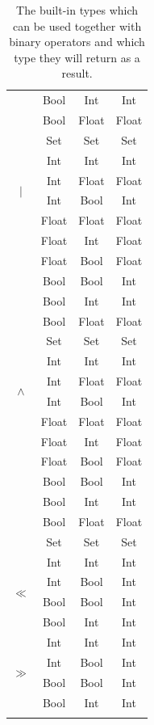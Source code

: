 \documentclass[12pt, titlepage]{article}
\begin{document}
\begin{longtable}{ |c |c |c |c | }
	                     & Bool & Int & Int \\
	                     & Bool & Float & Float \\
	                      & Set & Set & Set \\     
	                      \hline 
	\multirow{4}{*}{$|$} & Int & Int & Int \\
	                     & Int & Float & Float \\
	                     & Int & Bool & Int \\
	                     & Float & Float & Float \\
	                     & Float & Int & Float \\
	                     & Float & Bool & Float \\
	                     & Bool & Bool & Int \\
	                     & Bool & Int & Int \\
	                     & Bool & Float & Float \\
	                     & Set & Set & Set \\   
	                     \hline 
	\multirow{4}{*}{$\wedge$} & Int & Int & Int \\
	                     & Int & Float & Float \\
	                     & Int & Bool & Int \\
	                     & Float & Float & Float \\
	                     & Float & Int & Float \\
	                     & Float & Bool & Float \\
	                     & Bool & Bool & Int \\
	                     & Bool & Int & Int \\
	                     & Bool & Float & Float \\
	                     & Set & Set & Set \\        
	                     \hline               
	\multirow{4}{*}{$\ll$} & Int & Int & Int \\
	                     & Int & Bool & Int \\
	                     & Bool & Bool & Int \\
	                     & Bool & Int & Int \\
	                     \hline 
	\multirow{4}{*}{$\gg$} & Int & Int & Int \\
	                     & Int & Bool & Int \\
	                     & Bool & Bool & Int \\
	                     & Bool & Int & Int \\
	                     \hline    

    \caption{The built-in types which can be used together with binary operators and which type they will return as a result.}
    \end{longtable}




\newpage
{}

\end{document}

